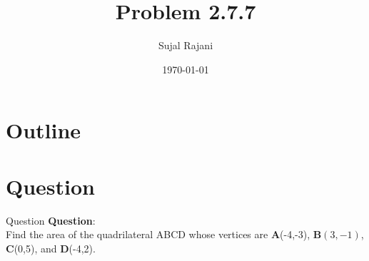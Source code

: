\documentclass{beamer}
\title{Problem 2.7.7}
\author{Sujal Rajani}
\date{\today}
\let\vec\mathbf
\theoremstyle{remark}
\numberwithin{equation}{section}
\begin{document}
\begin{frame}
\titlepage
\end{frame}

\section*{Outline}
\begin{frame}
\tableofcontents
\end{frame}
\section{Question}
\begin{frame}{Question}
\textbf{Question}:
\\

\noindent Find the area of the quadrilateral ABCD whose vertices are $\vec A$(-4,-3), $\vec B(3,-1)$,$\vec C$(0,5), and $\vec D$(-4,2).
\end{frame}
\end{document}
